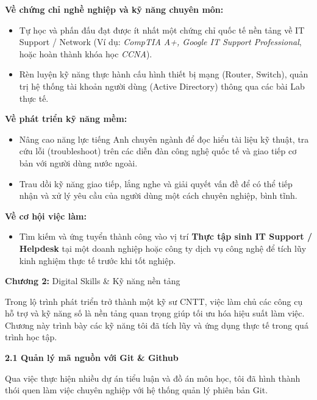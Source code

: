 \documentclass[
]{article}
\begin{document}
\textbf{Về chứng chỉ nghề nghiệp và kỹ năng chuyên môn:}

\begin{itemize}
\item
  Tự học và phấn đấu đạt được ít nhất một chứng chỉ quốc tế nền tảng về
  IT Support / Network (Ví dụ: \emph{CompTIA A+, Google IT Support
  Professional}, hoặc hoàn thành khóa học \emph{CCNA}).
\item
  Rèn luyện kỹ năng thực hành cấu hình thiết bị mạng (Router, Switch),
  quản trị hệ thống tài khoản người dùng (Active Directory) thông qua
  các bài Lab thực tế.
\end{itemize}

\textbf{Về phát triển kỹ năng mềm:}

\begin{itemize}
\item
  Nâng cao năng lực tiếng Anh chuyên ngành để đọc hiểu tài liệu kỹ
  thuật, tra cứu lỗi (troubleshoot) trên các diễn đàn công nghệ quốc tế
  và giao tiếp cơ bản với người dùng nước ngoài.
\item
  Trau dồi kỹ năng giao tiếp, lắng nghe và giải quyết vấn đề để có thể
  tiếp nhận và xử lý yêu cầu của người dùng một cách chuyên nghiệp, bình
  tĩnh.
\end{itemize}

\textbf{Về cơ hội việc làm:}

\begin{itemize}
\item
  Tìm kiếm và ứng tuyển thành công vào vị trí \textbf{Thực tập sinh IT
  Support / Helpdesk} tại một doanh nghiệp hoặc công ty dịch vụ công
  nghệ để tích lũy kinh nghiệm thực tế trước khi tốt nghiệp.
\end{itemize}

\textbf{Chương 2:} Digital Skills \& Kỹ năng nền tảng

Trong lộ trình phát triển trở thành một kỹ sư CNTT, việc làm chủ các
công cụ hỗ trợ và kỹ năng số là nền tảng quan trọng giúp tối ưu hóa hiệu
suất làm việc. Chương này trình bày các kỹ năng tôi đã tích lũy và ứng
dụng thực tế trong quá trình học tập.

\textbf{2.1 Quản lý mã nguồn với Git \& Github}

Qua việc thực hiện nhiều dự án tiểu luận và đồ án môn học, tôi đã hình
thành thói quen làm việc chuyên nghiệp với hệ thống quản lý phiên bản
Git.
\end{document}
